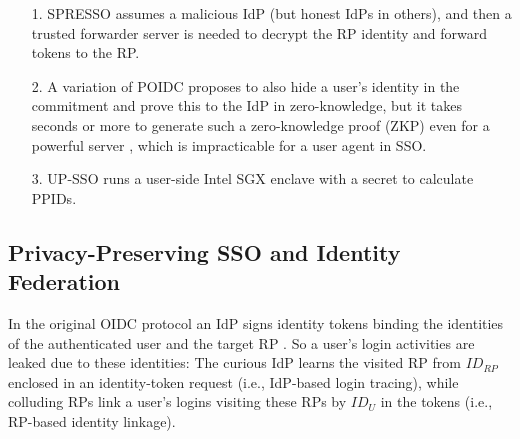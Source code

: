 \begin{table*}[tb]
{\begin{itemize}
\item[1.]
SPRESSO assumes a malicious IdP (but honest IdPs in others), and then a trusted forwarder server is needed to decrypt the RP identity and forward tokens to the RP.

\item[2.]
A variation of POIDC \cite{POIDC} proposes to also hide a user's identity in the commitment and prove this to the IdP in zero-knowledge,
        but it takes seconds or more to generate such a zero-knowledge proof (ZKP) even for a powerful server \cite{ZKP-BINF,zkp-benchmark,ZKP-GPU},
        which is impracticable for a user agent in SSO.
\item[3.]
UP-SSO \cite{up-sso} runs a user-side Intel SGX enclave with a secret to calculate PPIDs.
%
\end{itemize}}
\end{table*}

\subsection{Privacy-Preserving SSO and Identity Federation}
\label{subsec-solutions}
In the original OIDC protocol 
    an IdP signs identity tokens binding the identities of the authenticated user and the target RP \cite{OpenIDConnect,rfc6749}.
So
    a user's login activities are leaked due to these identities:
        The curious IdP learns the visited RP from $ID_{RP}$ enclosed in an identity-token request (i.e., IdP-based login tracing),
        while colluding RPs link a user's logins visiting these RPs by $ID_{U}$ in the tokens (i.e., RP-based identity linkage).




